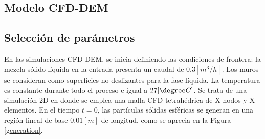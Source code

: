 \begin{center}
	\section{Modelo CFD-DEM}
\end{center}

\subsection{Selecci\'on de par\'ametros}

\noindent
\justify

En las simulaciones CFD-DEM, se inicia definiendo las condiciones de frontera: la mezcla s\'olido-l\'iquida en la entrada presenta un caudal de $0.3 \left[m^3 /h \right]$. Los muros se consideran como superficies no deslizantes para la fase l\'iquida. La temperatura es constante durante todo el proceso e igual a $27 [\degree C]$. Se trata de una simulaci\'on 2D en donde se emplea una malla CFD tetrah\'edrica de X nodos y X elementos. En el tiempo $t=0$, las part\'iculas s\'olidas esf\'ericas se generan en una regi\'on lineal de base $0.01 [m]$ de longitud, como se aprecia en la Figura \ref{generation}.

